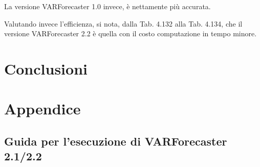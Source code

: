 \documentclass[12pt,a4paper,oneside,openright]{book}
\begin{document}
La versione VARForecaster 1.0 invece, è nettamente più accurata.

Valutando invece l'efficienza, si nota, dalla Tab. 4.132 alla Tab. 4.134, che il versione VARForecaster 2.2 è quella con il costo computazione in tempo minore.

\chapter{Conclusioni}
\chapter{Appendice}
\section{Guida per l’esecuzione di VARForecaster 2.1/2.2}\
\end{document}
